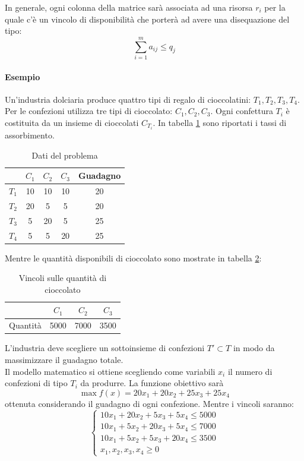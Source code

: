 \documentclass{article}
\begin{document}
In generale, ogni colonna della matrice sarà associata ad una risorsa $r_i$ per la 
quale c'è un vincolo di disponibilità che porterà ad avere una disequazione del tipo: 
\begin{equation*}
  \sum_{i=1}^m a_{ij} \leq q_j
\end{equation*}

\paragraph{Esempio}
Un'industria dolciaria produce quattro tipi di regalo di cioccolatini: $T_1, T_2, 
T_3, T_4$. Per le confezioni utilizza tre tipi di cioccolato: $C_1, C_2, C_3$.
Ogni confettura $T_i$ è costituita da un insieme di cioccolati $C_{T_i}$.
In tabella \ref{tab:dati_esempio2} sono riportati i tassi di assorbimento.
\begin{table}[b]
  \center
  \begin{tabular}{|c|c|c|c|c|}
    \hline
    & $C_1$ & $C_2$ & $C_3$ & Guadagno \\
    \hline
    $T_1$ & 10 & 10 & 10 & 20 \\
    $T_2$ & 20 & 5 & 5 & 20\\
    $T_3$ & 5 & 20 & 5 & 25\\
    $T_4$ & 5 & 5 & 20 & 25 \\
    \hline
  \end{tabular} 
  \caption{Dati del problema}
  \label{tab:dati_esempio2}
\end{table}

Mentre le quantità disponibili di cioccolato sono mostrate in tabella 
\ref{tab:vincoli_esempio2}:
\begin{table}
  \center
  \begin{tabular}{|c|c|c|c|}
    \hline
    & $C_1$ & $C_2$ & $C_3$ \\
    \hline
    Quantità & 5000 & 7000 & 3500 \\
    \hline
  \end{tabular}
  \caption{Vincoli sulle quantità di cioccolato}
  \label{tab:vincoli_esempio2}
\end{table}

L'industria deve scegliere un sottoinsieme di confezioni $T' \subset T$ in
modo da massimizzare il guadagno totale.\\ 
Il modello matematico si ottiene scegliendo come variabili $x_i$ il numero di 
confezioni di tipo $T_i$ da produrre. La funzione obiettivo sarà $$\max
f(x) = 20x_1 + 20x_2 + 25x_3 + 25x_4$$ 
ottenuta considerando il guadagno di ogni confezione. Mentre i vincoli saranno:
\begin{equation*}
  \begin{cases}
    10x_1 + 20x_2 + 5x_3 + 5x_4 \leq 5000 \\
    10x_1 + 5x_2 + 20x_3 + 5x_4 \leq 7000 \\
    10x_1 + 5x_2 + 5x_3 + 20x_4 \leq 3500 \\
    x_1, x_2, x_3, x_4 \geq 0
  \end{cases}
\end{equation*}
\end{document}
